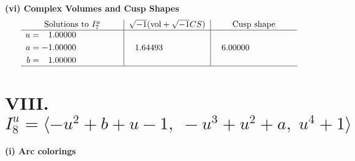 \documentclass[1p]{elsarticle_modified}
\theoremstyle{definition}
\newcommand{\I}{\sqrt{-1}}
\begin{document}
\newpage\flushleft \textbf{(vi) Complex Volumes and Cusp Shapes}
$$\begin{array}{c|c|c}  
\text{Solutions to }I^u_{7}& \I (\text{vol} + \sqrt{-1}CS) & \text{Cusp shape}\\
 \hline 
\begin{aligned}
u &= \phantom{-}1.00000\phantom{ +0.000000I} \\
a &= -1.00000\phantom{ +0.000000I} \\
b &= \phantom{-}1.00000\phantom{ +0.000000I}\end{aligned}
 & \phantom{-}1.64493\phantom{ +0.000000I} & \phantom{-}6.00000\phantom{ +0.000000I}\\
 \hline 
 \end{array}$$\newpage\newpage\renewcommand{\arraystretch}{1}
\centering \section*{VIII. $I^u_{8}= \langle - u^2+b+u-1,\;- u^3+u^2+a,\;u^4+1 \rangle$}
\flushleft \textbf{(i) Arc colorings}\\
\end{document}
